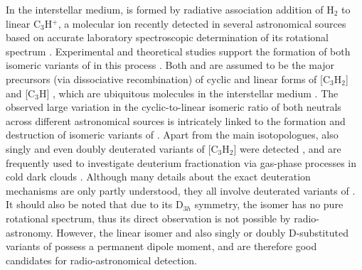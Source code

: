 In the interstellar medium, \iso is formed by radiative association addition of H$_2$ to linear C$_3$H$^+$, a molecular ion recently detected in several astronomical sources \citep{PGG2012,MCL2013,MCS2014} based on accurate laboratory spectroscopic determination of its rotational spectrum \citep{brunken_laboratory_2014,MCM2015}. Experimental and theoretical studies support the formation of both isomeric variants of \iso in this process \citep{SA1987,Adams1987,MMY1993, savic_low-temperature_2005}. Both \cyc and \lin  are assumed to be the major precursors (via dissociative recombination) of cyclic and linear forms of [C$_{3}$H$_{2}$] and [C$_3$H] \citep{Herbst1983, Adams1987, smith_ion_1992}, which are ubiquitous molecules in the interstellar medium \citep{Thaddeus1985,MI1985,CGG1991,KKO1991,CCF1999,YSO1987,TGH1985}. The observed large variation in the cyclic-to-linear isomeric ratio of both neutrals across different astronomical sources is intricately linked to the formation and destruction of isomeric variants of \iso \citep{MMH1993,CGP2015,SSC2016,LAW2017}. Apart from the main isotopologues, also singly and even doubly deuterated variants of [C$_{3}$H$_{2}$] were detected \citep{BFM1986,SBS2013,SGB2016}, and are frequently used to investigate deuterium fractionation via gas-phase processes in cold dark clouds \citep{GWC1987,BAM1988,MGA2017}. Although many details about the exact deuteration mechanisms are only partly understood, they all involve deuterated variants of \iso \citep{SSG2005,SBS2013}. It should also be noted that due to its D$_{3h}$ symmetry, the \cyc isomer has no pure rotational spectrum, thus its direct observation is not possible by radio-astronomy. However, the linear isomer \lin  and also singly or doubly D-substituted variants of \cyc possess a permanent dipole moment, and are therefore good candidates for radio-astronomical detection. \\  


